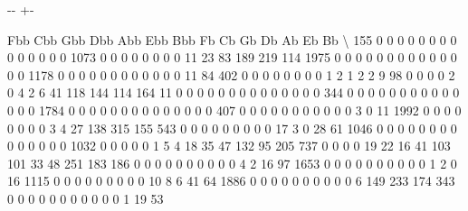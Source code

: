 \documentclass[letterpaper,10pt,english]{sphinxmanual}
\newlength\nbsphinxcodecellspacing
\begin{document}
{

\kern-\sphinxverbatimsmallskipamount\kern-\baselineskip
\kern+\FrameHeightAdjust\kern-\fboxrule
\vspace{\nbsphinxcodecellspacing}

\begin{sphinxVerbatim}[commandchars=\\\{\}]
\llap{\color{nbsphinxout}[9]:\,\hspace{\fboxrule}\hspace{\fboxsep}}      Fbb  Cbb  Gbb  Dbb  Abb  Ebb  Bbb  Fb   Cb   Gb   Db   Ab   Eb   Bb  \textbackslash{}
155     0    0    0    0    0    0    0   0    0    0    0    0    0    0
1073    0    0    0    0    0    0    0   0   11   23   83  189  219  114
1975    0    0    0    0    0    0    0   0    0    0    0    0    0    0
1178    0    0    0    0    0    0    0   0    0    0    0    0   11   84
402     0    0    0    0    0    0    0   0    1    2    1    2    2    9
98      0    0    0    0    2    0    4   2    6   41  118  144  114  164
11      0    0    0    0    0    0    0   0    0    0    0    0    0    0
344     0    0    0    0    0    0    0   0    0    0    0    0    0    0
1784    0    0    0    0    0    0    0   0    0    0    0    0    0    0
407     0    0    0    0    0    0    0   0    0    0    0    3    0   11
1992    0    0    0    0    0    0    0   0    3    4   27  138  315  155
543     0    0    0    0    0    0    0   0    0   17    3    0   28   61
1046    0    0    0    0    0    0    0   0    0    0    0    0    0    0
1032    0    0    0    0    0    1    5   4   18   35   47  132   95  205
737     0    0    0    0   19   22   16  41  103  101   33   48  251  183
186     0    0    0    0    0    0    0   0    0    0    4    2   16   97
1653    0    0    0    0    0    0    0   0    0    0    1    2    0   16
1115    0    0    0    0    0    0    0   0    0   10    8    6   41   64
1886    0    0    0    0    0    0    0   0    0    0    6  149  233  174
343     0    0    0    0    0    0    0   0    0    0    0    1   19   53


\end{sphinxVerbatim}}
\end{document}
